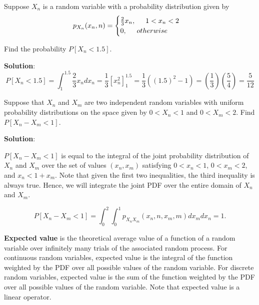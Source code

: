 \begin{exmp}
	Suppose $X_n$ is a random variable with a probability distribution given by
	\begin{equation*}
		p_{X_n}(x_n,n) = \begin{cases}
			\frac{2}{3}x_n, \hspace{0.5cm} 1 < x_n < 2 \\
			0, \hspace{0.5cm} otherwise
			\end{cases}
	\end{equation*}
	
	Find the probability $P[X_n < 1.5]$.
	
	\vspace{0.5cm}
	
	\textbf{Solution}:
	\begin{equation*}
		P[X_n < 1.5] = \int_{1}^{1.5}\frac{2}{3}x_ndx_n = \frac{1}{3}\left[ x_n^2 \right]_1^{1.5} = \frac{1}{3}((1.5)^2 - 1) = \left(\frac{1}{3} \right) \left(\frac{5}{4} \right) = \frac{5}{12	}
	\end{equation*}
\end{exmp}

\vspace{0.5cm}

\begin{exmp}
	Suppose that $X_n$ and $X_m$ are two independent random variables with uniform probability distributions on the space given by $ 0 < X_n < 1$ and $0 < X_m < 2$. Find $P[X_n - X_m < 1]$.
	
	\vspace{0.5cm}
	
	\textbf{Solution}:
	
	$P[X_n - X_m < 1]$ is equal to the integral of the joint probability distribution of $X_n$ and $X_m$ over the set of values $(x_n, x_m)$ satisfying $0 < x_n < 1$, $0 < x_m < 2$, and $x_n < 1 + x_m$. Note that given the first two inequalities, the third inequality is always true. Hence, we will integrate the joint PDF over the entire domain of $X_n$ and $X_m$.
	
	\begin{equation*}
		P[X_n - X_m < 1] = \int_0^2 \int_0^1 p_{X_nX_m}(x_n, n, x_m, m)dx_mdx_n = 1.
	\end{equation*}
\end{exmp}

\vspace {0.5cm}

\textbf{Expected value} is the theoretical average value of a function of a random variable over infinitely many trials of the associated random process. For continuous random variables, expected value is the integral of the function weighted by the PDF over all possible values of the random variable. For discrete random variables, expected value is the sum of the function weighted by the PDF over all possible values of the random variable. Note that expected value is a linear operator.


